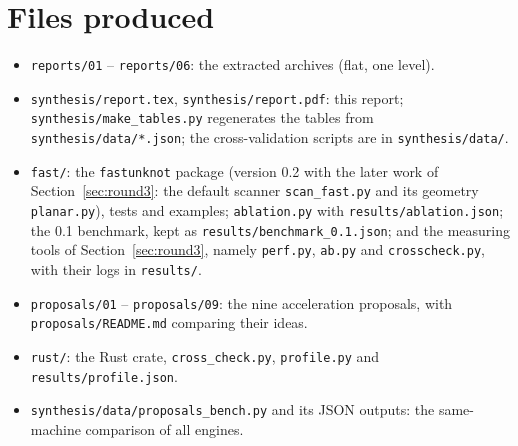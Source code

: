 \documentclass[11pt]{article}
\theoremstyle{remark}
\newcommand{\code}[1]{\texttt{#1}}
\begin{document}
\section{Files produced}
\begin{itemize}
\item \code{reports/01} -- \code{reports/06}: the extracted archives (flat, one level).
\item \code{synthesis/report.tex}, \code{synthesis/report.pdf}: this report;
  \code{synthesis/make\_tables.py} regenerates the tables from
  \code{synthesis/data/*.json}; the cross-validation scripts are in
  \code{synthesis/data/}.
\item \code{fast/}: the \code{fastunknot} package (version 0.2 with the later
  work of Section~\ref{sec:round3}: the default scanner \code{scan\_fast.py}
  and its geometry \code{planar.py}), tests and examples; \code{ablation.py}
  with \code{results/ablation.json}; the 0.1 benchmark, kept as
  \code{results/benchmark\_0.1.json}; and the measuring tools of
  Section~\ref{sec:round3}, namely \code{perf.py}, \code{ab.py} and
  \code{crosscheck.py}, with their logs in \code{results/}.
\item \code{proposals/01} -- \code{proposals/09}: the nine acceleration
  proposals, with \code{proposals/README.md} comparing their ideas.
\item \code{rust/}: the Rust crate, \code{cross\_check.py}, \code{profile.py}
  and \code{results/profile.json}.
\item \code{synthesis/data/proposals\_bench.py} and its JSON outputs: the
  same-machine comparison of all engines.
\end{itemize}
\end{document}

